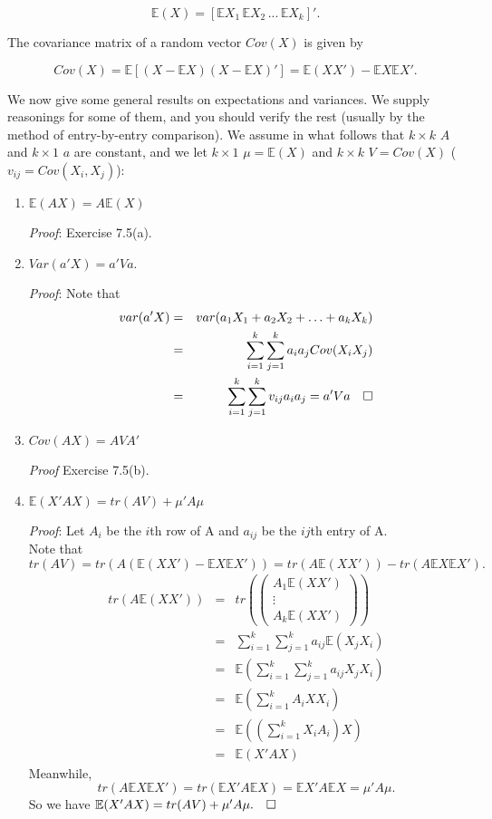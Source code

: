 \documentclass[12pt,oneside]{article}
\begin{document}
\[\mathbb{E}(X) = [\mathbb{E}X_1 \, \mathbb{E}X_2 \, ... \, \mathbb{E}X_k]'.\]

The covariance matrix of a random vector $Cov(X)$ is given by

\[Cov(X) = \mathbb{E}[(X- \mathbb{E}X)(X- \mathbb{E}X)']= \mathbb{E}(XX')- \mathbb{E}X \mathbb{E}X'.\]


We now give some general results on expectations and variances. We supply
reasonings for some of them, and you should verify the rest (usually
by the method of entry-by-entry comparison). We assume in what follows
that $k \times k$ $A$ and $k \times 1$ $a$ are constant, and we let
$k \times 1$ $ \mu = \mathbb{E}(X)$ and $k \times k$ $V = Cov(X)$ ($v_{ij} =
Cov(X_i, X_j)$):

\begin{enumerate}
\item $\mathbb{E}(AX) = A \mathbb{E}(X)$

\emph{Proof}: Exercise 7.5(a).

\item $Var(a'X) = a'Va$.

\emph{Proof}: Note that  \begin{eqnarray*} var(a'X) &=& var(a_1 X_1 + a_2 X_2 + \ldots + a_k X_k) \\ &=& \displaystyle\sum_{i=1}^k {\displaystyle\sum_{j=1}^k {a_i a_j
  Cov(X_i X_j)}}  \\ &=& \displaystyle\sum_{i=1}^k
  {\displaystyle\sum_{j=1}^k {v_{ij} a_i a_j}} = a'Va \hspace{10 pt} \Box \end{eqnarray*}

\item $Cov(AX) = AVA'$

\emph{Proof} Exercise 7.5(b).

\item $\mathbb{E}(X'AX) = tr(AV) + \mu' A \mu$

\emph{Proof}: Let $A_i$ be the $i$th row of A and $a_{ij}$ be the $ij$th entry of A. \\
Note that 
$tr(AV)=tr(A(\mathbb{E}(XX')-\mathbb{E}X \mathbb{E}X'))=tr(A\mathbb{E}(XX'))-tr(A\mathbb{E}X \mathbb{E}X'). $
\begin{eqnarray*}
tr(A\mathbb{E}(XX'))&=& tr\left(\begin{pmatrix} A_1 \mathbb{E}(XX')\\ \vdots \\ A_k \mathbb{E}(XX')  \end{pmatrix}  \right)\\
	&=& \sum_{i=1}^k\sum_{j=1}^k a_{ij} \mathbb{E}(X_jX_i)\\
	&=&\mathbb{E}\left(\sum_{i=1}^k\sum_{j=1}^k a_{ij}X_jX_i \right)\\
	&=&\mathbb{E}\left(\sum_{i=1}^k A_iXX_i\right)\\
	&=&\mathbb{E}\left(\left(\sum_{i=1}^k X_iA_i\right)X\right)\\
	&=&\mathbb{E}(X'AX) 
\end{eqnarray*}
Meanwhile, 
$$tr(A\mathbb{E}X\mathbb{E}X')=tr(\mathbb{E}X'A\mathbb{E}X)=\mathbb{E}X'A \mathbb{E}X=\mu' A\mu. $$
So we have $\mathbb{E}(X'AX) = tr(AV) + \mu' A \mu. \hspace{10 pt} \Box$



\end{enumerate}
\end{document}
